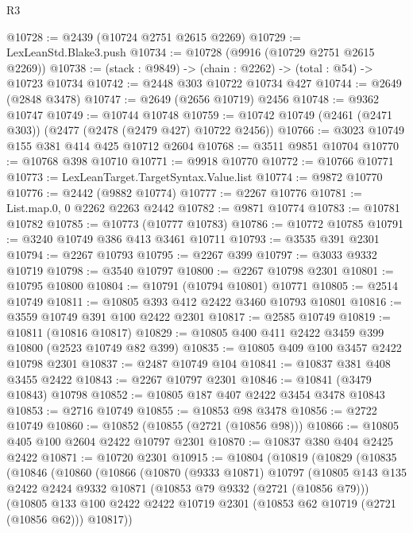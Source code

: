 \begin{lexlean}{R3}
\begin{coremodule}
@10728 := @2439 (@10724 @2751 @2615 @2269)
@10729 := LexLeanStd.Blake3.push
@10734 := @10728 (@9916 (@10729 @2751 @2615 @2269))
@10738 := (stack : @9849) -> (chain : @2262) -> (total : @54) -> @10723 @10734
@10742 := @2448 @303 @10722 @10734 @427
@10744 := @2649 (@2848 @3478)
@10747 := @2649 (@2656 @10719) @2456
@10748 := @9362 @10747
@10749 := @10744 @10748
@10759 := @10742 @10749 (@2461 (@2471 @303)) (@2477 (@2478 (@2479 @427) @10722 @2456))
@10766 := @3023 @10749 @155 @381 @414 @425 @10712 @2604
@10768 := @3511 @9851 @10704
@10770 := @10768 @398 @10710
@10771 := @9918 @10770
@10772 := @10766 @10771
@10773 := LexLeanTarget.TargetSyntax.Value.list
@10774 := @9872 @10770
@10776 := @2442 (@9882 @10774)
@10777 := @2267 @10776
@10781 := List.map.{0, 0} @2262 @2263 @2442
@10782 := @9871 @10774
@10783 := @10781 @10782
@10785 := @10773 (@10777 @10783)
@10786 := @10772 @10785
@10791 := @3240 @10749 @386 @413 @3461 @10711
@10793 := @3535 @391 @2301
@10794 := @2267 @10793
@10795 := @2267 @399
@10797 := @3033 @9332 @10719
@10798 := @3540 @10797
@10800 := @2267 @10798 @2301
@10801 := @10795 @10800
@10804 := @10791 (@10794 @10801) @10771
@10805 := @2514 @10749
@10811 := @10805 @393 @412 @2422 @3460 @10793 @10801
@10816 := @3559 @10749 @391 @100 @2422 @2301
@10817 := @2585 @10749
@10819 := @10811 (@10816 @10817)
@10829 := @10805 @400 @411 @2422 @3459 @399 @10800 (@2523 @10749 @82 @399)
@10835 := @10805 @409 @100 @3457 @2422 @10798 @2301
@10837 := @2487 @10749 @104
@10841 := @10837 @381 @408 @3455 @2422
@10843 := @2267 @10797 @2301
@10846 := @10841 (@3479 @10843) @10798
@10852 := @10805 @187 @407 @2422 @3454 @3478 @10843
@10853 := @2716 @10749
@10855 := @10853 @98 @3478
@10856 := @2722 @10749
@10860 := @10852 (@10855 (@2721 (@10856 @98)))
@10866 := @10805 @405 @100 @2604 @2422 @10797 @2301
@10870 := @10837 @380 @404 @2425 @2422
@10871 := @10720 @2301
@10915 := @10804
    (@10819
      (@10829
        (@10835
          (@10846
            (@10860
              (@10866
                (@10870
                  (@9333 @10871)
                  @10797
                  (@10805
                    @143
                    @135
                    @2422
                    @2424
                    @9332
                    @10871
                    (@10853 @79 @9332 (@2721 (@10856 @79)))
                    (@10805
                      @133
                      @100
                      @2422
                      @2422
                      @10719
                      @2301
                      (@10853 @62 @10719 (@2721 (@10856 @62)))
                      @10817))

\end{coremodule}
\end{lexlean}
